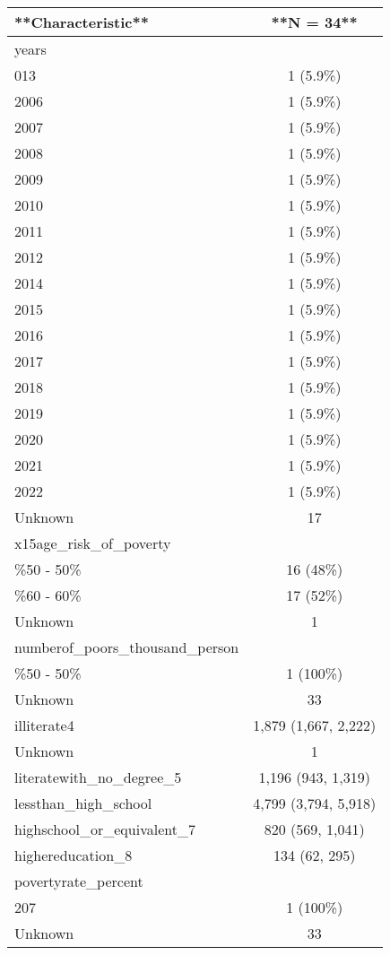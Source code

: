 \documentclass[
  12pt,
]{article}
\begin{document}
\begin{tabular}{l|c}
\hline
**Characteristic** & **N = 34**\\
\hline
years & \\
\hline
013 & 1 (5.9\%)\\
\hline
2006 & 1 (5.9\%)\\
\hline
2007 & 1 (5.9\%)\\
\hline
2008 & 1 (5.9\%)\\
\hline
2009 & 1 (5.9\%)\\
\hline
2010 & 1 (5.9\%)\\
\hline
2011 & 1 (5.9\%)\\
\hline
2012 & 1 (5.9\%)\\
\hline
2014 & 1 (5.9\%)\\
\hline
2015 & 1 (5.9\%)\\
\hline
2016 & 1 (5.9\%)\\
\hline
2017 & 1 (5.9\%)\\
\hline
2018 & 1 (5.9\%)\\
\hline
2019 & 1 (5.9\%)\\
\hline
2020 & 1 (5.9\%)\\
\hline
2021 & 1 (5.9\%)\\
\hline
2022 & 1 (5.9\%)\\
\hline
Unknown & 17\\
\hline
x15age\_risk\_of\_poverty & \\
\hline
\%50 - 50\% & 16 (48\%)\\
\hline
\%60 - 60\% & 17 (52\%)\\
\hline
Unknown & 1\\
\hline
numberof\_poors\_thousand\_person & \\
\hline
\%50 - 50\% & 1 (100\%)\\
\hline
Unknown & 33\\
\hline
illiterate4 & 1,879 (1,667, 2,222)\\
\hline
Unknown & 1\\
\hline
literatewith\_no\_degree\_5 & 1,196 (943, 1,319)\\
\hline
lessthan\_high\_school & 4,799 (3,794, 5,918)\\
\hline
highschool\_or\_equivalent\_7 & 820 (569, 1,041)\\
\hline
highereducation\_8 & 134 (62, 295)\\
\hline
povertyrate\_percent & \\
\hline
207 & 1 (100\%)\\
\hline
Unknown & 33\\

\end{tabular}
\end{document}
